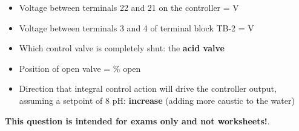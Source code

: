 
\begin{itemize}
\item{} Voltage between terminals 22 and 21 on the controller =  V
\vskip 10pt
\item{} Voltage between terminals 3 and 4 of terminal block TB-2 =  V
\vskip 10pt
\item{} Which control valve is completely shut: the {\bf acid valve}
\vskip 10pt
\item{} Position of open valve = \% open 
\vskip 10pt
\item{} Direction that integral control action will drive the controller output, assuming a setpoint of 8 pH: {\bf increase} (adding more caustic to the water)
\end{itemize}







{\bf This question is intended for exams only and not worksheets!}.



